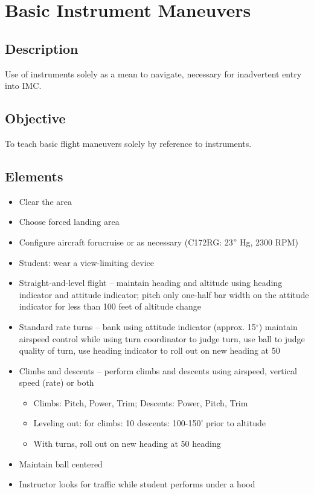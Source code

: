 \section{Basic Instrument Maneuvers}

\subsection{Description}

Use of instruments solely as a mean to navigate,
necessary for inadvertent entry into IMC.

\subsection{Objective}

To teach basic flight maneuvers solely by reference to
instruments.

\subsection{Elements}

\begin{itemize}
  \item Clear the area
  \item Choose forced landing area
  \item Configure aircraft forucruise or as necessary (C172RG: 23'' Hg, 2300
    RPM)
  \item Student: wear a view-limiting device
  \item Straight-and-level flight -- maintain heading and altitude using heading
indicator and attitude indicator; pitch only one-half bar width on the attitude
indicator for less than 100 feet of altitude change
  \item Standard rate turns -- bank using attitude indicator (approx.
    15$^\circ$) maintain airspeed control while using turn coordinator to judge
    turn, use ball to judge quality of turn, use heading indicator to roll out
    on new heading at 50%
  \item Climbs and descents -- perform climbs and descents using airspeed,
    vertical speed (rate) or both
    \begin{itemize}
      \item Climbs: Pitch, Power, Trim; Descents: Power, Pitch, Trim
      \item Leveling out: for climbs: 10%
        descents: 100-150' prior to altitude
      \item With turns, roll out on new heading at 50%
        heading
    \end{itemize}
  \item Maintain ball centered
  \item Instructor looks for traffic while student performs under a hood
\end{itemize}

